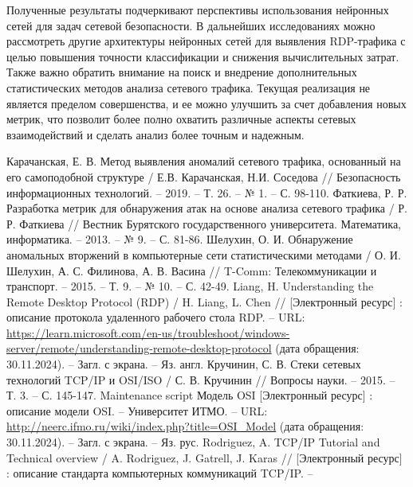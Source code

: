 \documentclass[spec, och, diploma]{SCWorks}
\begin{document}
Полученные результаты подчеркивают перспективы использования нейронных сетей для задач сетевой безопасности. 
В дальнейших исследованиях можно рассмотреть другие архитектуры нейронных сетей для выявления RDP-трафика с целью повышения точности 
классификации и снижения вычислительных затрат. Также важно обратить внимание на поиск и внедрение дополнительных статистических методов анализа 
сетевого трафика. Текущая реализация не является пределом совершенства, и ее можно улучшить за счет добавления новых метрик, что позволит более полно 
охватить различные аспекты сетевых взаимодействий и сделать анализ более точным и надежным.

\begin{thebibliography}{25}
    Карачанская, Е. В. Метод выявления аномалий сетевого трафика, основанный на его самоподобной структуре / Е.В. Карачанская, Н.И. Соседова // 
    Безопасность информационных технологий. -- 2019. -- Т. 26. -- № 1. -- С. 98-110.
    Фаткиева, Р. Р. Разработка метрик для обнаружения атак на основе анализа сетевого трафика / Р. Р. Фаткиева // Вестник Бурятского государственного университета. 
    Математика, информатика. -- 2013. -- № 9. -- С. 81-86.
    Шелухин, О. И. Обнаружение аномальных вторжений в компьютерные сети статистическими методами / О. И. Шелухин, А. С. Филинова, А. В. Васина // T-Comm: 
    Телекоммуникации и транспорт. -- 2015. -- Т. 9. -- № 10. -- С. 42-49.
    Liang, H. Understanding the Remote Desktop Protocol (RDP) / H. Liang, L. Chen // [Электронный ресурс] : описание протокола удаленного рабочего стола RDP. -- 
    URL: \url{https://learn.microsoft.com/en-us/troubleshoot/windows-server/remote/understanding-remote-desktop-protocol} (дата обращения: 30.11.2024). -- Загл. с экрана. -- Яз. англ.
    Кручинин, С. В. Стеки сетевых технологий TCP/IP и OSI/ISO / С. В. Кручинин // Вопросы науки. -- 2015. -- Т. 3. -- С. 145-147.
    Maintenance script Модель OSI [Электронный ресурс] : описание модели OSI. -- Университет ИТМО. -- URL: \url{http://neerc.ifmo.ru/wiki/index.php?title=OSI_Model}
    (дата обращения: 30.11.2024). -- Загл. с экрана. -- Яз. рус.
    Rodriguez, A. TCP/IP Tutorial and Technical overview / A. Rodriguez, J. Gatrell, J. Karas // [Электронный ресурс] : описание стандарта компьютерных коммуникаций TCP/IP. --

\end{thebibliography}
\end{document}
